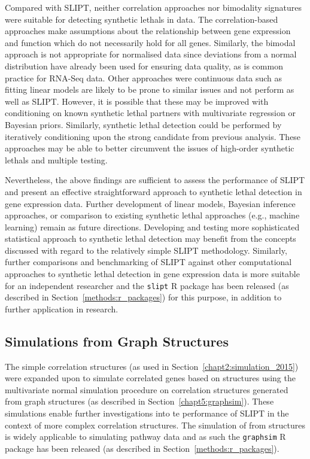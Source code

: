Compared with \gls{SLIPT}, neither correlation approaches nor bimodality signatures were suitable for detecting \glspl{synthetic lethal} in  data. The correlation-based approaches make assumptions about the relationship between \gls{gene expression} and function which do not necessarily hold for all genes. Similarly, the bimodal approach is not appropriate for normalised data since deviations from a normal distribution have already been used for ensuring data quality, as is common practice for \gls{RNA-Seq} data. Other approaches were continuous data such as fitting linear models are likely to be prone to similar issues and not perform as well as \gls{SLIPT}. However, it is possible that these may be improved with conditioning on known \gls{synthetic lethal} partners with multivariate regression or Bayesian priors. Similarly, \gls{synthetic lethal} detection could be performed by iteratively conditioning upon the strong candidate from previous analysis. These approaches may be able to better circumvent the issues of high-order \glspl{synthetic lethal} and multiple testing. 

Nevertheless, the above findings are sufficient to assess the performance of \gls{SLIPT} and present an effective straightforward approach to \gls{synthetic lethal} detection in \gls{gene expression} data. Further development of linear models, Bayesian inference approaches, or comparison to existing \gls{synthetic lethal} approaches (e.g., machine learning) remain as future directions. Developing and testing more sophisticated statistical approach to \gls{synthetic lethal} detection may benefit from the concepts discussed with regard to the relatively simple \gls{SLIPT} methodology. Similarly, further comparisons and benchmarking of \gls{SLIPT} against other computational approaches to \gls{synthetic lethal} detection in \gls{gene expression} data is more suitable for an independent researcher and the \texttt{slipt} R package has been released (as described in Section~\ref{methods:r_packages}) for this purpose, in addition to further application in research.


\subsection{Simulations from Graph Structures}

The simple correlation structures (as used in Section~\ref{chapt2:simulation_2015}) were expanded upon to simulate correlated genes based on  structures using the multivariate normal simulation procedure on correlation structures generated from graph structures (as described in Section~\ref{chapt5:graphsim}). These simulations enable further investigations into te performance of \gls{SLIPT} in the context of more complex correlation structures. The simulation of  from  structures is widely applicable to simulating pathway  data and as such the \texttt{graphsim} R package has been released (as described in Section~\ref{methods:r_packages}).


